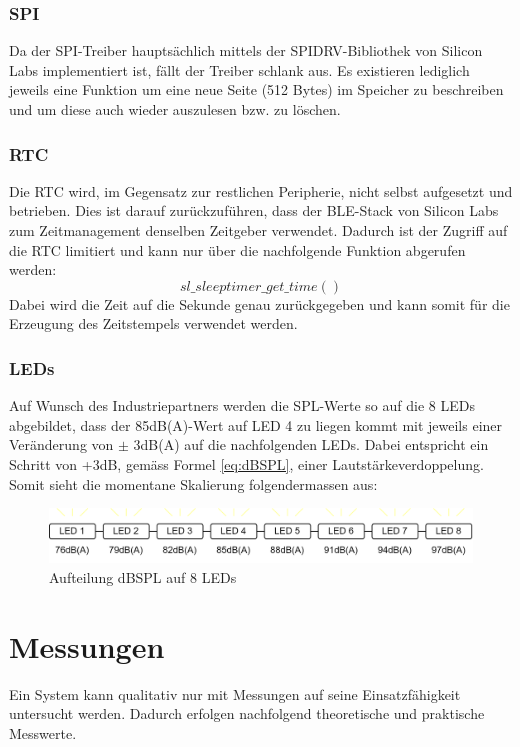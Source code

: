 \documentclass[12pt]{article}
\begin{document}
	\subsubsection*{SPI}
	Da der SPI-Treiber hauptsächlich mittels der SPIDRV-Bibliothek von Silicon Labs implementiert ist, fällt der Treiber schlank aus. Es existieren lediglich jeweils eine Funktion um eine neue Seite (512 Bytes) im Speicher zu beschreiben und um diese auch wieder auszulesen bzw. zu löschen.
	\subsubsection*{RTC}
	Die RTC wird, im Gegensatz zur restlichen Peripherie, nicht selbst aufgesetzt und betrieben. Dies ist darauf zurückzuführen, dass der BLE-Stack von Silicon Labs zum Zeitmanagement denselben Zeitgeber verwendet. Dadurch ist der Zugriff auf die RTC limitiert und kann nur über die nachfolgende Funktion abgerufen werden:
	$$ sl\_sleeptimer\_get\_time() $$
	Dabei wird die Zeit auf die Sekunde genau zurückgegeben und kann somit für die Erzeugung des Zeitstempels verwendet werden.
	\subsubsection*{LEDs} \label{LEDs}
	Auf Wunsch des Industriepartners werden die SPL-Werte so auf die 8 LEDs abgebildet, dass der 85dB(A)-Wert auf LED 4 zu liegen kommt mit jeweils einer Veränderung von $\pm$ 3dB(A) auf die nachfolgenden LEDs. Dabei entspricht ein Schritt von +3dB, gemäss Formel \ref{eq:dBSPL}, einer Lautstärkeverdoppe\-lung. Somit sieht die momentane Skalierung folgendermassen aus:
	\begin{figure}[H]
		\centering
		\includegraphics[width=1\linewidth]{images/BAT_Skalierung-SPL-auf-LED}
		\caption{Aufteilung dBSPL auf 8 LEDs}
		\label{fig:batskalierung-spl-auf-led}
	\end{figure}
	
	
	\newpage
	\section{Messungen}\label{Messungen}
	Ein System kann qualitativ nur mit Messungen auf seine Einsatzfähigkeit untersucht werden. Dadurch erfolgen nachfolgend theoretische und praktische Messwerte.
\end{document}

